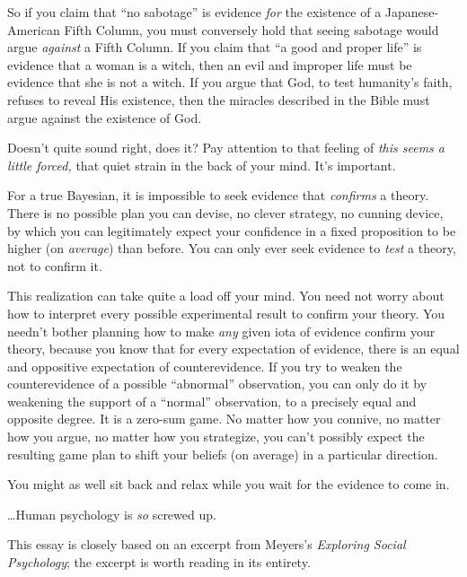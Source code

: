 {
 So if you claim that ``no
sabotage'' is evidence \textit{for} the existence of
a Japanese-American Fifth Column, you must conversely hold that seeing
sabotage would argue \textit{against} a Fifth Column. If you claim that
``a good and proper life'' is
evidence that a woman is a witch, then an evil and improper life must
be evidence that she is not a witch. If you argue that God, to test
humanity's faith, refuses to reveal His existence, then
the miracles described in the Bible must argue against the existence of
God.}

{
 Doesn't quite sound right, does it? Pay attention
to that feeling of \textit{this seems a little forced,} that quiet
strain in the back of your mind. It's important.}

{
 For a true Bayesian, it is impossible to seek evidence that
\textit{confirms} a theory. There is no possible plan you can devise,
no clever strategy, no cunning device, by which you can legitimately
expect your confidence in a fixed proposition to be higher (on
\textit{average}) than before. You can only ever seek evidence to
\textit{test} a theory, not to confirm it.}

{
 This realization can take quite a load off your mind. You need not
worry about how to interpret every possible experimental result to
confirm your theory. You needn't bother planning how to
make \textit{any} given iota of evidence confirm your theory, because
you know that for every expectation of evidence, there is an equal and
oppositive expectation of counterevidence. If you try to weaken the
counterevidence of a possible
``abnormal'' observation, you can
only do it by weakening the support of a
``normal'' observation, to a
precisely equal and opposite degree. It is a zero-sum game. No matter
how you connive, no matter how you argue, no matter how you strategize,
you can't possibly expect the resulting game plan to
shift your beliefs (on average) in a particular direction.}

{
 You might as well sit back and relax while you wait for the
evidence to come in.}

{
 \ldots Human psychology is \textit{so} screwed up.}

\myendsectiontext


{
 This essay is closely based on an excerpt from
Meyers's \textit{Exploring Social
Psychology}; the excerpt is worth reading in its
entirety. }

